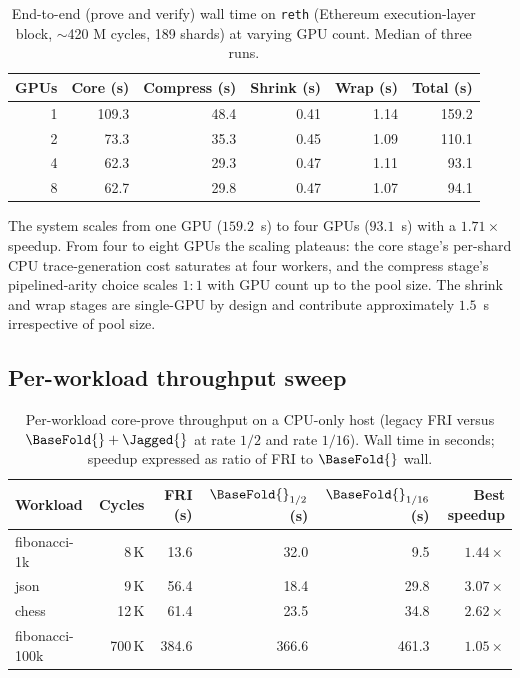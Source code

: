 \begin{table}[t]
\centering
\caption{End-to-end (prove and verify) wall time on \texttt{reth} (Ethereum execution-layer block, $\sim$420 M cycles, 189 shards) at varying GPU count. Median of three runs.}
\label{tab:reth-multigpu}
\begin{tabular}{rrrrrr}
\toprule
GPUs & Core (s) & Compress (s) & Shrink (s) & Wrap (s) & Total (s) \\
\midrule
1 & 109.3 & 48.4 & 0.41 & 1.14 & 159.2 \\
2 & 73.3 & 35.3 & 0.45 & 1.09 & 110.1 \\
4 & 62.3 & 29.3 & 0.47 & 1.11 & 93.1 \\
8 & 62.7 & 29.8 & 0.47 & 1.07 & 94.1 \\
\bottomrule
\end{tabular}
\end{table}

The system scales from one GPU ($159.2$~s) to four GPUs ($93.1$~s) with a $1.71\times$ speedup. From four to eight GPUs the scaling plateaus: the core stage's per-shard CPU trace-generation cost saturates at four workers, and the compress stage's pipelined-arity choice scales $1{:}1$ with GPU count up to the pool size. The shrink and wrap stages are single-GPU by design and contribute approximately $1.5$~s irrespective of pool size.

\subsection{Per-workload throughput sweep}

\begin{table}[t]
\centering
\caption{Per-workload core-prove throughput on a CPU-only host (legacy FRI versus $\BaseFold{}+\Jagged{}$ at rate $1/2$ and rate $1/16$). Wall time in seconds; speedup expressed as ratio of FRI to $\BaseFold{}$ wall.}
\label{tab:workload-sweep}
\begin{tabular}{lrrrrr}
\toprule
Workload & Cycles & FRI (s) & $\BaseFold{}_{1/2}$ (s) & $\BaseFold{}_{1/16}$ (s) & Best speedup \\
\midrule
fibonacci-1k & 8\,K & 13.6 & 32.0 & 9.5 & $1.44\times$ \\
json & 9\,K & 56.4 & 18.4 & 29.8 & $3.07\times$ \\
chess & 12\,K & 61.4 & 23.5 & 34.8 & $2.62\times$ \\
fibonacci-100k & 700\,K & 384.6 & 366.6 & 461.3 & $1.05\times$ \\
\bottomrule
\end{tabular}
\end{table}

